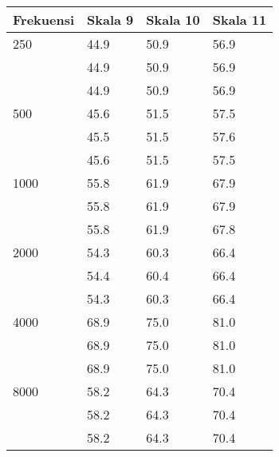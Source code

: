 \documentclass{article} %
\begin{document}
	\begin{table}[!ht]
		\begin{tabular}{|l|l|l|l|}
			\hline
			\textbf{Frekuensi}	& \textbf{Skala 9} & \textbf{Skala 10} & \textbf{Skala 11} \\ \hline
			250	& 44.9 & 50.9 & 56.9 \\ \hline
				& 44.9 & 50.9 & 56.9 \\ \hline
				& 44.9 & 50.9 & 56.9 \\ \hline \hline
			500	& 45.6 & 51.5 & 57.5 \\ \hline
				& 45.5 & 51.5 & 57.6 \\ \hline
				& 45.6 & 51.5 & 57.5 \\ \hline \hline
			1000& 55.8 & 61.9 & 67.9 \\ \hline
				& 55.8 & 61.9 & 67.9 \\ \hline
				& 55.8 & 61.9 & 67.8 \\ \hline \hline
			2000& 54.3 & 60.3 & 66.4 \\ \hline
				& 54.4 & 60.4 & 66.4 \\ \hline
				& 54.3 & 60.3 & 66.4 \\ \hline \hline
			4000& 68.9 & 75.0 & 81.0 \\ \hline
				& 68.9 & 75.0 & 81.0 \\ \hline
				& 68.9 & 75.0 & 81.0 \\ \hline \hline
			8000& 58.2 & 64.3 & 70.4 \\ \hline
				& 58.2 & 64.3 & 70.4 \\ \hline
				& 58.2 & 64.3 & 70.4 \\ \hline \hline
		\end{tabular}
	\end{table}
\end{document}
